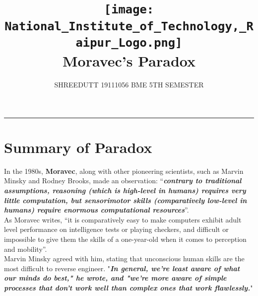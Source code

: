 \documentclass[13pt,letterpaper]{article}
\begin{document}
\title{
\texttt{[image: National\_Institute\_of\_Technology,\_Raipur\_Logo.png]}
\\ 
Moravec's Paradox 
}

\author{SHREEDUTT 19111056 BME 5TH SEMESTER}

\maketitle
\rule{\textwidth}{0.5pt}
\nolinebreak[4]
\section*{Summary of Paradox}
In the 1980s, \textbf{Moravec}, along with other pioneering scientists, such as Marvin Minsky and Rodney Brooks, made an observation: “\textbf{\textit{contrary to traditional assumptions, reasoning (which is high-level in humans) requires very little computation, but sensorimotor skills (comparatively low-level in humans) require enormous computational resources}}”.
\\
As Moravec writes, “it is comparatively easy to make computers exhibit adult level performance on intelligence tests or playing checkers, and difficult or impossible to give them the skills of a one-year-old when it comes to perception and mobility”.
\\
Marvin Minsky agreed with him, stating that unconscious human skills are the most difficult to reverse engineer. "\textbf{\textit{In general, we're least aware of what our minds do best," he wrote, and "we're more aware of simple processes that don't work well than complex ones that work flawlessly.}}"
\\
\end{document}
